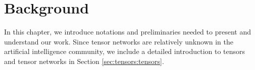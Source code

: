 \chapter{Background}
\label{ch:background}
In this chapter, we introduce notations and preliminaries needed to present and understand our work. Since tensor networks are relatively unknown in the artificial intelligence community, we include a detailed introduction to tensors and tensor networks in Section \ref{sec:tensors:tensors}.





